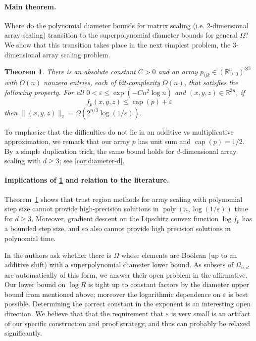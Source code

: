 \documentclass[10pt,a4paper]{article}
\newtheorem{thm}{Theorem}[section]\crefname{thm}{Theorem}{Theorems}
\numberwithin{equation}{section}
\newcommand{\poly}{\operatorname{poly}}
\DeclareMathOperator{\capa}{cap}
\newcommand{\RR}{\mathbb R}
\newcommand{\ot}{\otimes}
\newcommand{\eps}{\varepsilon}
\newcommand{\norm}[1]{\lVert#1\rVert}
\begin{document}
\paragraph{Main theorem.}
Where do the polynomial diameter bounds for matrix scaling (i.e. $2$-dimensional array scaling) transition to the superpolynomial diameter bounds for general $\Omega$? We show that this transition takes place in the next simplest problem, the $3$-dimensional array scaling problem.


\begin{thm}\label{thm:diameter}
There is an absolute constant $C > 0$ and an array $p_{ijk} \in (\RR_{\geq 0}^n)^{\ot 3}$ with $O(n)$ nonzero entries, each of bit-complexity $O(n)$, that satisfies the following property. For all $0 <\eps \leq  \exp(- C n^2 \log n)$ and $(x,y,z) \in \RR^{3n}$, if
	$$f_p (x,y,z) \leq \capa(p) + \eps $$
	then $\norm{(x,y,z)}_2 = \Omega\left(2^{n/3}\log(1/\eps)\right).$
\end{thm}


To emphasize that the difficulties do not lie in an additive vs multiplicative approximation, we remark that our array $p$ has unit sum and $\capa(p) = 1/2$. By a simple duplication trick, the same bound holds for $d$-dimensional array scaling with $d \geq 3$; see \cref{cor:diameter-d}.



\paragraph{Implications of \cref{thm:diameter} and relation to the literature.}

Theorem~\ref{thm:diameter} shows that trust region methods for array scaling with polynomial step size cannot provide high-precision solutions in $\poly(n,\log(1/\eps))$ time for
$d \geq 3$. Moreover, gradient descent on the Lipschitz convex function $\log f_p$ has a bounded step size, and so also cannot provide high precision solutions in polynomial time.

In \cite[Section 2.1]{straszak2017computing} the authors ask whether there is $\Omega$ whose elements are Boolean (up to an additive shift) with a superpolynomial diameter lower bound. As subsets of $\Omega_{n,d}$ are automatically of this form, we answer their open problem in the affirmative. Our lower bound on $\log R$ is tight up to constant factors by the diameter upper bound from \cite{straszak2017computing} mentioned above; moreover the logarithmic dependence on $\eps$ is best possible. Determining the correct constant in the exponent is an interesting open direction. We believe that that the requirement that $\eps$ is very small is an artifact of our specific construction and proof strategy, and thus can probably be relaxed significantly.
\end{document}
